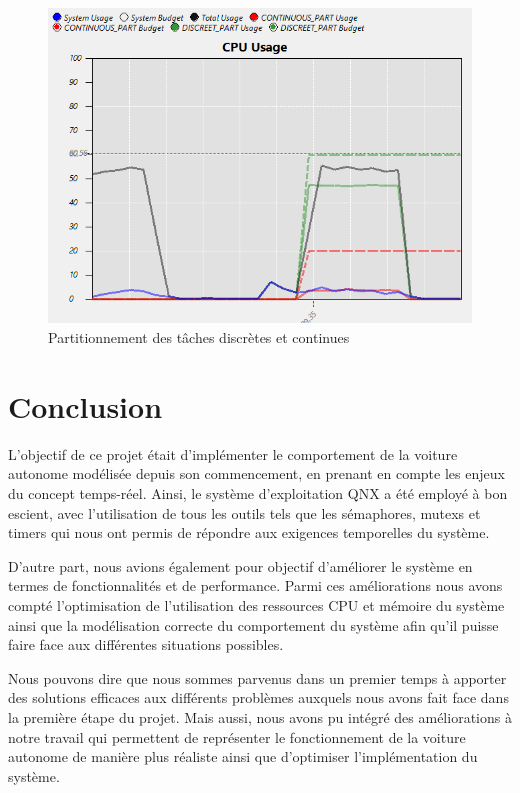 \documentclass[conference]{IEEEtran}
\begin{document}
\begin{figure}[h]
    \centering
    \includegraphics[width=\linewidth]{partitionnement.png}
    \caption{Partitionnement des tâches discrètes et continues}
    \label{fig:partitionnement}
\end{figure}

\section{Conclusion}

L'objectif de ce projet était d'implémenter le comportement de la voiture autonome
modélisée depuis son commencement, en prenant en compte les enjeux du concept temps-réel.
Ainsi, le système d'exploitation QNX a été employé à bon escient, avec l'utilisation de
tous les outils tels que les sémaphores, mutexs et timers qui nous ont permis de répondre
aux exigences temporelles du système. 

D'autre part, nous avions également pour objectif d'améliorer le système en termes de
fonctionnalités et de performance. Parmi ces améliorations nous avons compté
l'optimisation de l'utilisation des ressources CPU et mémoire du système ainsi que la
modélisation correcte du comportement du système afin qu'il puisse faire face aux
différentes situations possibles.

Nous pouvons dire que nous sommes parvenus dans un premier temps à apporter des solutions
efficaces aux différents problèmes auxquels nous avons fait face dans la première étape du
projet. Mais aussi, nous avons pu intégré des améliorations à notre travail qui permettent
de représenter le fonctionnement de la voiture autonome de manière plus réaliste ainsi que
d'optimiser l'implémentation du système.
\end{document}
